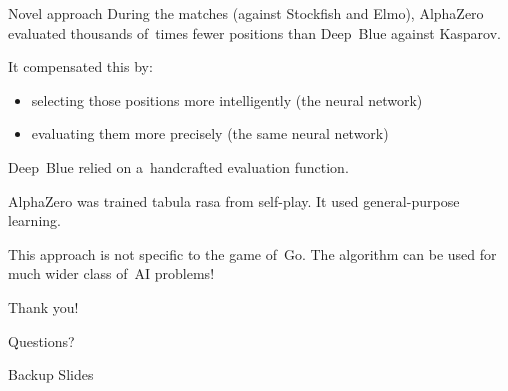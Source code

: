 \documentclass{beamer}
\begin{document}
{    \begin{frame}{Novel approach}
      \pause
      During the matches (against Stockfish and Elmo), AlphaZero evaluated \alert{thousands of~times fewer} positions than Deep~Blue against Kasparov.
      \pause

      It compensated this by:
      \begin{itemize}[<+->]
        \item selecting those positions \alert{more intelligently} (the neural network)
        \item evaluating them \alert{more precisely} (the same neural network)
      \end{itemize}
      \pause

      Deep~Blue relied on a~handcrafted evaluation function.
      \pause

      AlphaZero was trained \alert{tabula rasa} from self-play.
      It used \alert{general-purpose} learning.
      \pause

      This approach is not specific to the game of~Go.
      The algorithm can be used \alert{for much wider class} of~AI problems!
    \end{frame}
  }

  \begin{frame}[standout]
    \begin{center}
      Thank you!

      Questions?
    \end{center}
  \end{frame}


  \appendix
  \begin{frame}[standout]
    Backup Slides
  \end{frame}
\end{document}
